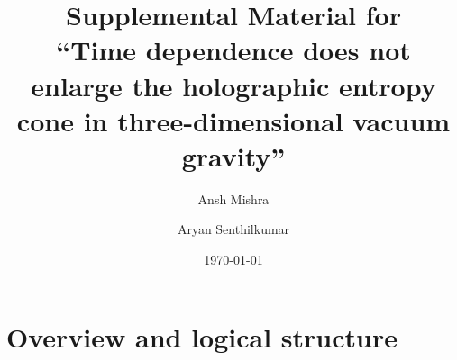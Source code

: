 \documentclass[aps,prd,onecolumn,superscriptaddress,nofootinbib,amsmath,amssymb,11pt]{revtex4-2}
\theoremstyle{definition}
\begin{document}
\title{Supplemental Material for\\ ``Time dependence does not enlarge the holographic entropy cone in
three-dimensional vacuum gravity''}

\author{Ansh Mishra}
\author{Aryan Senthilkumar}

\date{\today}

\maketitle

\tableofcontents

\section{Overview and logical structure}\label{sec:overview}
\end{document}

